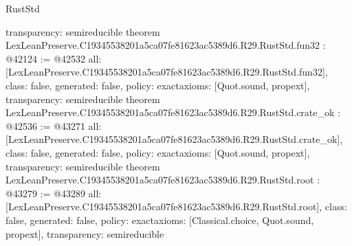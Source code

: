 \begin{lexlean}{RustStd}
\begin{coremodule}
{  transparency: semireducible
}
theorem LexLeanPreserve.C19345538201a5ca07fe81623ac5389d6.R29.RustStd.fun32 : @42124 := @42532 {
  all: [LexLeanPreserve.C19345538201a5ca07fe81623ac5389d6.R29.RustStd.fun32],
  class: false,
  generated: false,
  policy: exact{axioms: [Quot.sound, propext]},
  transparency: semireducible
}
theorem LexLeanPreserve.C19345538201a5ca07fe81623ac5389d6.R29.RustStd.crate_ok : @42536 := @43271 {
  all: [LexLeanPreserve.C19345538201a5ca07fe81623ac5389d6.R29.RustStd.crate_ok],
  class: false,
  generated: false,
  policy: exact{axioms: [Quot.sound, propext]},
  transparency: semireducible
}
theorem LexLeanPreserve.C19345538201a5ca07fe81623ac5389d6.R29.RustStd.root : @43279 := @43289 {
  all: [LexLeanPreserve.C19345538201a5ca07fe81623ac5389d6.R29.RustStd.root],
  class: false,
  generated: false,
  policy: exact{axioms: [Classical.choice, Quot.sound, propext]},
  transparency: semireducible
}


\end{coremodule}
\end{lexlean}
